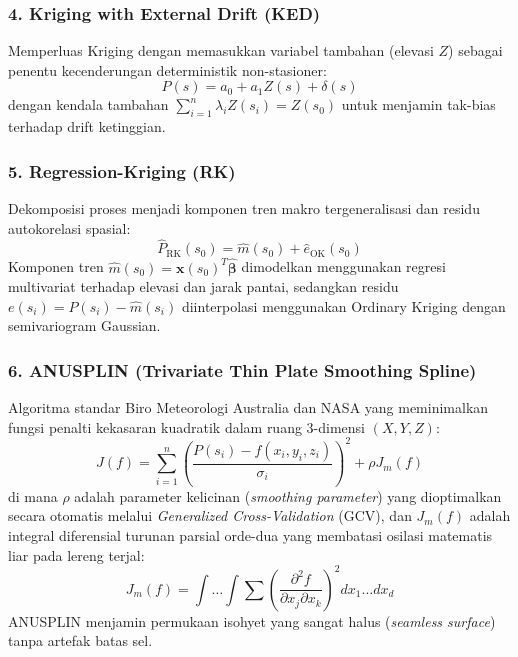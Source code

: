 \documentclass[11pt,a4paper]{article}
\begin{document}
\subsubsection{4. Kriging with External Drift (KED)}
Memperluas Kriging dengan memasukkan variabel tambahan (elevasi $Z$) sebagai penentu kecenderungan deterministik non-stasioner:
\begin{equation}
    P(s) = a_0 + a_1 Z(s) + \delta(s)
\end{equation}
dengan kendala tambahan $\sum_{i=1}^n \lambda_i Z(s_i) = Z(s_0)$ untuk menjamin tak-bias terhadap drift ketinggian.

\subsubsection{5. Regression-Kriging (RK)}
Dekomposisi proses menjadi komponen tren makro tergeneralisasi dan residu autokorelasi spasial:
\begin{equation}
    \hat{P}_{\text{RK}}(s_0) = \hat{m}(s_0) + \hat{e}_{\text{OK}}(s_0)
\end{equation}
Komponen tren $\hat{m}(s_0) = \mathbf{x}(s_0)^T \hat{\boldsymbol{\beta}}$ dimodelkan menggunakan regresi multivariat terhadap elevasi dan jarak pantai, sedangkan residu $e(s_i) = P(s_i) - \hat{m}(s_i)$ diinterpolasi menggunakan Ordinary Kriging dengan semivariogram Gaussian.

\subsubsection{6. ANUSPLIN (Trivariate Thin Plate Smoothing Spline)}
Algoritma standar Biro Meteorologi Australia dan NASA \cite{hutchinson1995anusplin} yang meminimalkan fungsi penalti kekasaran kuadratik dalam ruang 3-dimensi $(X, Y, Z)$:
\begin{equation}
    J(f) = \sum_{i=1}^n \left( \frac{P(s_i) - f(x_i, y_i, z_i)}{\sigma_i} \right)^2 + \rho J_m(f)
\end{equation}
di mana $\rho$ adalah parameter kelicinan (\textit{smoothing parameter}) yang dioptimalkan secara otomatis melalui \textit{Generalized Cross-Validation} (GCV), dan $J_m(f)$ adalah integral diferensial turunan parsial orde-dua yang membatasi osilasi matematis liar pada lereng terjal:
\begin{equation}
    J_m(f) = \int \dots \int \sum \left( \frac{\partial^2 f}{\partial x_j \partial x_k} \right)^2 dx_1 \dots dx_d
\end{equation}
ANUSPLIN menjamin permukaan isohyet yang sangat halus (\textit{seamless surface}) tanpa artefak batas sel.
\end{document}
